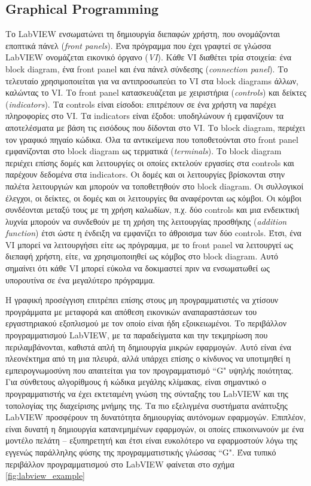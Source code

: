 \subsection{Graphical Programming}

Το LabVIEW ενσωματώνει τη δημιουργία διεπαφών χρήστη, που ονομάζονται εποπτικά πάνελ (\emph{front panels}). Ένα πρόγραμμα που έχει γραφτεί σε γλώσσα LabVIEW ονομάζεται εικονικό όργανο (\emph{VI}). Κάθε VI διαθέτει τρία στοιχεία: ένα block diagram, ένα front panel και ένα πάνελ σύνδεσης (\emph{connection panel}). Το τελευταίο χρησιμοποιείται για να αντιπροσωπεύει το VI στα block diagrams άλλων, καλώντας το VI. Το front panel κατασκευάζεται με χειριστήρια (\emph{controls}) και δείκτες (\emph{indicators}). Τα controls είναι είσοδοι: επιτρέπουν σε ένα χρήστη να παρέχει πληροφορίες στο VI. Τα indicators είναι έξοδοι: υποδηλώνουν ή εμφανίζουν τα αποτελέσματα με βάση τις εισόδους που δίδονται στο VI. Το block diagram, περιέχει τον γραφικό πηγαίο κώδικα. Όλα τα αντικείμενα που τοποθετούνται στο front panel εμφανίζονται στο block diagram ως τερματικά (\emph{terminals}). Το block diagram περιέχει επίσης δομές και λειτουργίες οι οποίες εκτελούν εργασίες στα controls και παρέχουν δεδομένα στα indicators. Οι δομές και οι λειτουργίες βρίσκονται στην παλέτα λειτουργιών και μπορούν να τοποθετηθούν στο block diagram. Οι συλλογικοί έλεγχοι, οι δείκτες, οι δομές και οι λειτουργίες θα αναφέρονται ως κόμβοι. Οι κόμβοι συνδέονται μεταξύ τους με τη χρήση καλωδίων, π.χ. δύο controls και μια ενδεικτική λυχνία μπορούν να συνδεθούν με τη χρήση της λειτουργίας προσθήκης (\emph{addition function}) έτσι ώστε η ένδειξη να εμφανίζει το άθροισμα των δύο controls. Έτσι, ένα VI μπορεί να λειτουργήσει είτε ως πρόγραμμα, με το front panel να λειτουργεί ως διεπαφή χρήστη, είτε, να χρησιμοποιηθεί ως κόμβος στο block diagram. Αυτό σημαίνει ότι κάθε VI μπορεί εύκολα να δοκιμαστεί πριν να ενσωματωθεί ως υπορουτίνα σε ένα μεγαλύτερο πρόγραμμα.

Η γραφική προσέγγιση επιτρέπει επίσης στους μη προγραμματιστές να χτίσουν προγράμματα με μεταφορά και απόθεση εικονικών αναπαραστάσεων του εργαστηριακού εξοπλισμού με τον οποίο είναι ήδη εξοικειωμένοι. Το περιβάλλον προγραμματισμού LabVIEW, με τα παραδείγματα και την τεκμηρίωση που περιλαμβάνονται, καθιστά απλή τη δημιουργία μικρών εφαρμογών. Αυτό είναι ένα πλεονέκτημα από τη μια πλευρά, αλλά υπάρχει επίσης ο κίνδυνος να υποτιμηθεί η εμπειρογνωμοσύνη που απαιτείται για τον προγραμματισμό ``G" υψηλής ποιότητας. Για σύνθετους αλγορίθμους ή κώδικα μεγάλης κλίμακας, είναι σημαντικό ο προγραμματιστής να έχει εκτεταμένη γνώση της σύνταξης του LabVIEW και της τοπολογίας της διαχείρισης μνήμης της. Τα πιο εξελιγμένα συστήματα ανάπτυξης LabVIEW προσφέρουν τη δυνατότητα δημιουργίας αυτόνομων εφαρμογών. Επιπλέον, είναι δυνατή η δημιουργία κατανεμημένων εφαρμογών, οι οποίες επικοινωνούν με ένα μοντέλο πελάτη -- εξυπηρετητή και έτσι είναι ευκολότερο να εφαρμοστούν λόγω της εγγενώς παράλληλης φύσης της προγραμματιστικής γλώσσας ``G". Ένα τυπικό περιβάλλον προγραμματισμού στο LabVIEW φαίνεται στο σχήμα \ref{fig:labview_example}

